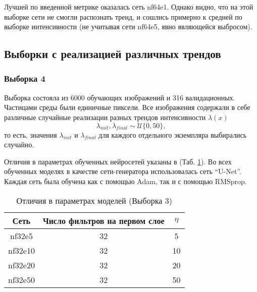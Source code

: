 			Лучшей по введенной метрике оказалась сеть nf64e1. Однако видно, что на этой выборке сети не смогли распознать тренд, и сошлись примерно к средней по выборке интенсивности (не учитывая сети nf64e5, явно являющейся выбросом).
		
	\subsection{Выборки с реализацией различных трендов}
		\subsubsection{Выборка 4}
			Выборка состояла из 6000 обучающих изображений и 316 валидационных. Частицами среды были единичные пиксели. Все изображения содержали в себе различные случайные реализации разных трендов интенсивности $\lambda(x)$
			$$ \lambda_{init}, \lambda_{final} \sim \mathcal{U}\{0, 50\}, $$
			то есть, значения $\lambda_{init}$ и $\lambda_{final}$ для каждого отдельного экземпляра выбирались случайно.
			
			Отличия в параметрах обученных нейросетей указаны в (Таб. \ref{8-dust-trend2-nns}). Во всех обученных моделях в качестве сети-генератора использовалась сеть ``U-Net''. Каждая сеть была обучена как с помощью Adam, так и с помощью RMSprop.
			
			\begin{table}[h!]
				\begin{center}
					\begin{tabular}{|c|c|c|}
						\hline
						Сеть & Число фильтров на первом слое & $\eta$ \\
						\hline
						nf32e5 & 32 & 5 \\
						\hline
						nf32e10 & 32 & 10 \\
						\hline
						nf32e20 & 32 & 20 \\
						\hline
						nf32e50 & 32 & 50 \\
						\hline
					\end{tabular}
					\caption{Отличия в параметрах моделей (Выборка 3)}
					\label{8-dust-trend2-nns}
				\end{center}
			\end{table}
			
